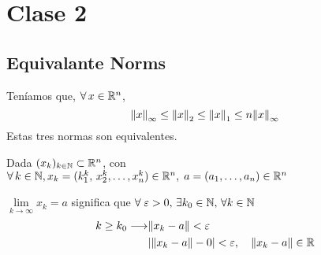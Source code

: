 \chapter{Clase 2}

\section{Equivalante Norms}
Teníamos que, $\forall\, x \in \mathbb{R}^{n}$,
$$
	\norm{x}_{\infty} \leq \norm{x}_2 \leq \norm{x}_1 \leq n \norm{x}_{\infty}
$$
Estas tres normas son equivalentes.

Dada $(x_k)_{k \in \mathbb{N}} \subset \mathbb{R}^{n}$, con $\forall \, k\in \mathbb{N}, x_k = (k_1^k, \, x_2^k, \ldots, x_n^k) \in \mathbb{R}^{n}, \; a = (a_1, \ldots ,a_n)\in \mathbb{R}^{n}$

$
	\lim\limits_{k \to \infty} x_k = a $ significa que $\forall\; \varepsilon>0,\, \exists k_0 \in \mathbb{N}, \, \forall k \in \mathbb{N}
$
\begin{align*}
	k \geq k_0 \longrightarrow & \norm{x_k-a} < \varepsilon                                      \\
	                           & \abs{ \norm{x_k-a}-0} < \varepsilon,  \quad \norm{x_k-a} \in \mathbb{R}
\end{align*}


